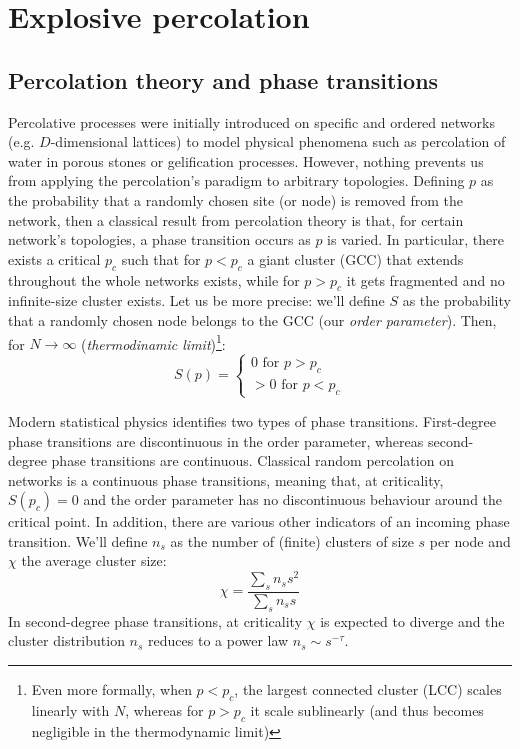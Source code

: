 \chapter{Explosive percolation}




\section{Percolation theory and phase transitions}

Percolative processes were initially introduced on specific and ordered networks (e.g. $D$-dimensional lattices) to model physical phenomena such as percolation of water in porous stones or gelification processes. However, nothing prevents us from applying the percolation's paradigm to arbitrary topologies. Defining $p$ as the probability that a randomly chosen site (or node) is removed from the network, then a classical result from percolation theory is that, for certain network's topologies, a phase transition occurs as $p$ is varied. In particular, there exists a critical $p_c$ such that for $p < p_c$ a giant cluster (GCC) that extends throughout the whole networks exists, while for $p> p_c$ it gets fragmented and no infinite-size cluster exists. Let us be more precise: we'll define $S$ as the probability that a randomly chosen node belongs to the GCC (our \textit{order parameter}). Then, for $N \to \infty$ (\textit{thermodinamic limit})\footnote{Even more formally, when $p<p_c$, the largest connected cluster (LCC) scales linearly with $N$, whereas for $p > p_c$ it scale sublinearly (and thus becomes negligible in the thermodynamic limit)}:
\begin{equation}
	S(p) = 
	\begin{cases}
		0 \mbox{ for } p > p_c\\ 
		> 0 \mbox{ for } p < p_c
	\end{cases}
\end{equation}

Modern statistical physics identifies two types of phase transitions. First-degree phase transitions are discontinuous in the order parameter, whereas second-degree phase transitions are continuous. Classical random percolation on networks is a continuous phase transitions, meaning that, at criticality, $S(p_c) = 0$ and the order parameter has no discontinuous behaviour around the critical point. In addition, there are various other indicators of an incoming phase transition. We'll define $n_s$ as the number of (finite) clusters of size $s$ per node and $\chi$ the average cluster size:
\begin{equation}
	\chi = \frac{\sum_s n_s s^2}{\sum_s n_s s}
\end{equation}
In second-degree phase transitions, at criticality $\chi$ is expected to diverge and the cluster distribution $n_s$ reduces to a power law $n_s \sim s^{-\tau}$.
 
